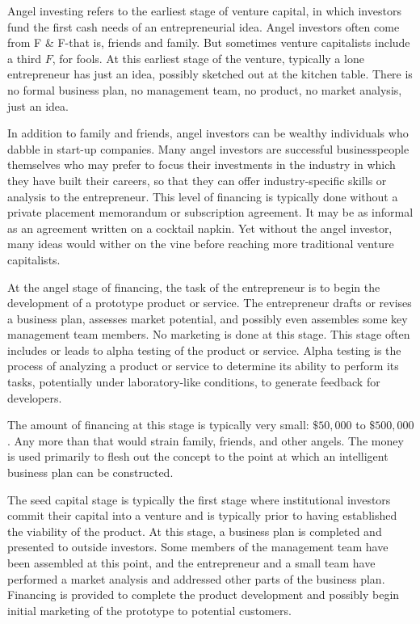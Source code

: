 \documentclass[11pt]{article}
\begin{document}
Angel investing refers to the earliest stage of venture capital, in which investors fund the first cash needs of an entrepreneurial idea. Angel investors often come from F \& F-that is, friends and family. But sometimes venture capitalists include a third $F$, for fools. At this earliest stage of the venture, typically a lone entrepreneur has just an idea, possibly sketched out at the kitchen table. There is no formal business plan, no management team, no product, no market analysis, just an idea.

In addition to family and friends, angel investors can be wealthy individuals who dabble in start-up companies. Many angel investors are successful businesspeople themselves who may prefer to focus their investments in the industry in which they have built their careers, so that they can offer industry-specific skills or analysis to the entrepreneur. This level of financing is typically done without a private placement memorandum or subscription agreement. It may be as informal as an agreement written on a cocktail napkin. Yet without the angel investor, many ideas would wither on the vine before reaching more traditional venture capitalists.

At the angel stage of financing, the task of the entrepreneur is to begin the development of a prototype product or service. The entrepreneur drafts or revises a business plan, assesses market potential, and possibly even assembles some key management team members. No marketing is done at this stage. This stage often includes or leads to alpha testing of the product or service. Alpha testing is the process of analyzing a product or service to determine its ability to perform its tasks, potentially under laboratory-like conditions, to generate feedback for developers.

The amount of financing at this stage is typically very small: $\$ 50,000$ to $\$ 500,000$. Any more than that would strain family, friends, and other angels. The money is used primarily to flesh out the concept to the point at which an intelligent business plan can be constructed.

The seed capital stage is typically the first stage where institutional investors commit their capital into a venture and is typically prior to having established the viability of the product. At this stage, a business plan is completed and presented to outside investors. Some members of the management team have been assembled at this point, and the entrepreneur and a small team have performed a market analysis and addressed other parts of the business plan. Financing is provided to complete the product development and possibly begin initial marketing of the prototype to potential customers.
\end{document}
